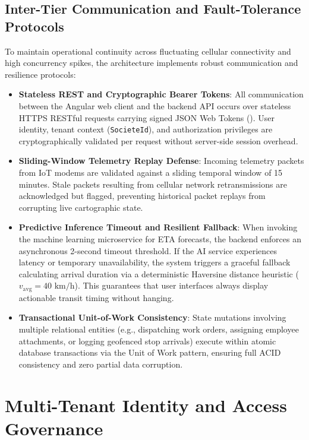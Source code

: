 \subsection{Inter-Tier Communication and Fault-Tolerance Protocols}
\label{subsec:inter_tier_protocols}
To maintain operational continuity across fluctuating cellular connectivity and high concurrency spikes, the architecture implements robust communication and resilience protocols:
\begin{itemize}
  \item \textbf{Stateless REST and Cryptographic Bearer Tokens}: All communication between the Angular web client and the backend API occurs over stateless HTTPS RESTful requests carrying signed JSON Web Tokens (). User identity, tenant context (\texttt{SocieteId}), and authorization privileges are cryptographically validated per request without server-side session overhead.
  \item \textbf{Sliding-Window Telemetry Replay Defense}: Incoming telemetry packets from IoT modems are validated against a sliding temporal window of 15 minutes. Stale packets resulting from cellular network retransmissions are acknowledged but flagged, preventing historical packet replays from corrupting live cartographic state.
  \item \textbf{Predictive Inference Timeout and Resilient Fallback}: When invoking the machine learning microservice for ETA forecasts, the backend enforces an asynchronous 2-second timeout threshold. If the AI service experiences latency or temporary unavailability, the system triggers a graceful fallback calculating arrival duration via a deterministic Haversine distance heuristic ($v_{\text{avg}} = 40\text{ km/h}$). This guarantees that user interfaces always display actionable transit timing without hanging.
  \item \textbf{Transactional Unit-of-Work Consistency}: State mutations involving multiple relational entities (e.g., dispatching work orders, assigning employee attachments, or logging geofenced stop arrivals) execute within atomic database transactions via the Unit of Work pattern, ensuring full ACID consistency and zero partial data corruption.
\end{itemize}

\section{Multi-Tenant Identity and Access Governance}
\label{sec:identity_access_governance}

